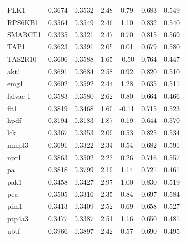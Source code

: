 \begin{center}
\begin{tabular}{lcccccc}
PLK1 & 0.3674 & 0.3532 & 2.48 & 0.79 & 0.683 & 0.549\\
RPS6KB1 & 0.3564 & 0.3549 & 2.46 & 1.10 & 0.832 & 0.540\\
SMARCD1 & 0.3335 & 0.3321 & 2.47 & 0.70 & 0.815 & 0.569\\
TAP1 & 0.3623 & 0.3391 & 2.05 & 0.01 & 0.679 & 0.580\\
TAS2R10 & 0.3606 & 0.3588 & 1.65 & -0.50 & 0.764 & 0.447\\
akt1 & 0.3691 & 0.3684 & 2.58 & 0.92 & 0.820 & 0.510\\
emg1 & 0.3602 & 0.3592 & 2.44 & 1.28 & 0.635 & 0.511\\
falvac-1 & 0.3583 & 0.3580 & 2.62 & 0.80 & 0.664 & 0.466\\
flt1 & 0.3819 & 0.3468 & 1.60 & -0.11 & 0.715 & 0.523\\
hpdf & 0.3194 & 0.3183 & 1.87 & 0.19 & 0.644 & 0.570\\
lck & 0.3367 & 0.3353 & 2.09 & 0.53 & 0.825 & 0.534\\
mmpl3 & 0.3691 & 0.3322 & 2.34 & 0.54 & 0.682 & 0.591\\
npr1 & 0.3863 & 0.3502 & 2.23 & 0.26 & 0.716 & 0.557\\
pa & 0.3818 & 0.3799 & 2.19 & 1.14 & 0.721 & 0.461\\
pak1 & 0.3458 & 0.3427 & 2.97 & 1.00 & 0.830 & 0.519\\
pea & 0.3505 & 0.3316 & 2.35 & 0.84 & 0.697 & 0.584\\
pim1 & 0.3413 & 0.3409 & 2.52 & 0.69 & 0.658 & 0.527\\
ptp4a3 & 0.3477 & 0.3387 & 2.51 & 1.16 & 0.650 & 0.481\\
ubtf & 0.3966 & 0.3897 & 2.42 & 0.57 & 0.690 & 0.495\\
\hline\hline\end{tabular}\end{center}
